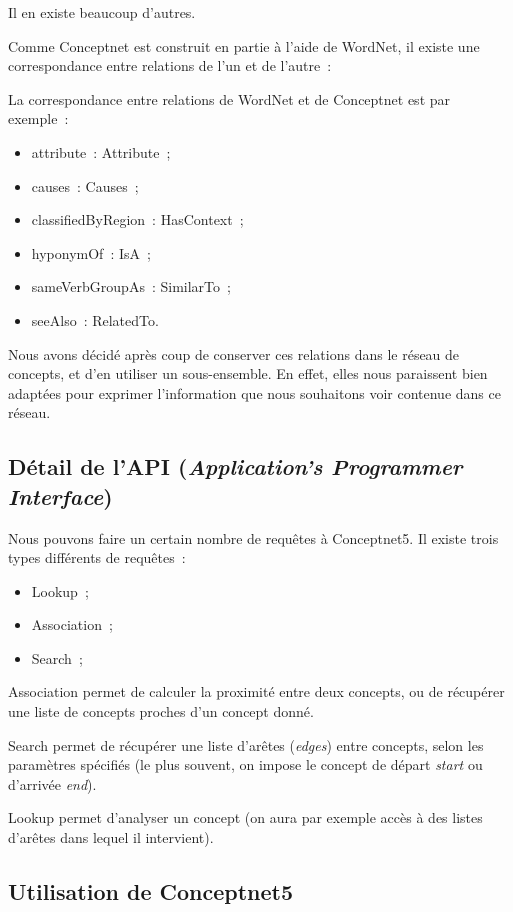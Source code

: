 \documentclass[a4paper, 12pt]{article}
\newcommand{\ang}[1]{\textit{#1}}%
\begin{document}
Il en existe beaucoup d'autres.

Comme Conceptnet est construit en partie à l'aide de WordNet, il existe une correspondance entre relations de l'un et de l'autre~:

La correspondance entre relations de WordNet et de Conceptnet est par exemple~:
\begin{itemize}
 \item attribute~: Attribute~;
 \item causes~: Causes~;
 \item classifiedByRegion~: HasContext~;
 \item hyponymOf~: IsA~;
 \item sameVerbGroupAs~: SimilarTo~;
 \item seeAlso~: RelatedTo.
\end{itemize}

Nous avons décidé après coup de conserver ces relations dans le réseau de concepts, et d'en utiliser un sous-ensemble. En effet, elles nous paraissent bien adaptées pour exprimer l'information que nous souhaitons voir contenue dans ce réseau.

\subsection{Détail de l'API (\ang{Application's Programmer Interface})}

Nous pouvons faire un certain nombre de requêtes à Conceptnet5. Il existe trois types différents de requêtes~:
\begin{itemize}
 \item Lookup~;
 \item Association~;
 \item Search~;
\end{itemize}
Association permet de calculer la proximité entre deux concepts, ou de récupérer une liste de concepts proches d'un concept donné.

Search permet de récupérer une liste d'arêtes (\ang{edges}) entre concepts, selon les paramètres spécifiés (le plus souvent, on impose le concept de départ \ang{start} ou d'arrivée \ang{end}).

Lookup permet d'analyser un concept (on aura par exemple accès à des listes d'arêtes dans lequel il intervient).


\subsection{Utilisation de Conceptnet5}
\end{document}
